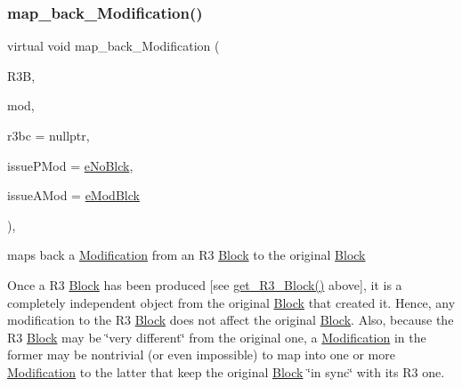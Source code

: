 \subsubsection{\texorpdfstring{map\+\_\+back\+\_\+\+Modification()}{map\_back\_Modification()}}
{\footnotesize\ttfamily virtual void map\+\_\+back\+\_\+\+Modification (\begin{DoxyParamCaption}\item[{\mbox{\hyperlink{class_s_m_spp__di__unipi__it_1_1_block}{Block}} $\ast$}]{R3B,  }\item[{\mbox{\hyperlink{group___modification___t_y_p_e_s_ga9024cf2ead61a1280d29771b063b1a62}{sp\+\_\+\+Mod}}}]{mod,  }\item[{\mbox{\hyperlink{class_s_m_spp__di__unipi__it_1_1_configuration}{Configuration}} $\ast$}]{r3bc = {\ttfamily nullptr},  }\item[{\mbox{\hyperlink{group___modification___t_y_p_e_s_ga544246d8c462e9a2d817c2c30797968f}{c\+\_\+\+Mod\+Param}}}]{issue\+P\+Mod = {\ttfamily \mbox{\hyperlink{group___modification___t_y_p_e_s_gga48fddcdd03a03f49b7e389ca1ed938d4ada69e89c5f46e563d8a13cfa6830c136}{e\+No\+Blck}}},  }\item[{\mbox{\hyperlink{group___modification___t_y_p_e_s_ga544246d8c462e9a2d817c2c30797968f}{c\+\_\+\+Mod\+Param}}}]{issue\+A\+Mod = {\ttfamily \mbox{\hyperlink{group___modification___t_y_p_e_s_gga48fddcdd03a03f49b7e389ca1ed938d4a21b14b26b1c0093a0905f6fc010bad29}{e\+Mod\+Blck}}} }\end{DoxyParamCaption})\hspace{0.3cm}{\ttfamily [inline]}, {\ttfamily [virtual]}}



maps back a \mbox{\hyperlink{class_s_m_spp__di__unipi__it_1_1_modification}{Modification}} from an R3 \mbox{\hyperlink{class_s_m_spp__di__unipi__it_1_1_block}{Block}} to the original \mbox{\hyperlink{class_s_m_spp__di__unipi__it_1_1_block}{Block}} 

Once a R3 \mbox{\hyperlink{class_s_m_spp__di__unipi__it_1_1_block}{Block}} has been produced \mbox{[}see \mbox{\hyperlink{class_s_m_spp__di__unipi__it_1_1_block_a2e682f5c0d4a74503c0cb5ab38fb6428}{get\+\_\+\+R3\+\_\+\+Block()}} above\mbox{]}, it is a completely independent object from the original \mbox{\hyperlink{class_s_m_spp__di__unipi__it_1_1_block}{Block}} that created it. Hence, any modification to the R3 \mbox{\hyperlink{class_s_m_spp__di__unipi__it_1_1_block}{Block}} does not affect the original \mbox{\hyperlink{class_s_m_spp__di__unipi__it_1_1_block}{Block}}. Also, because the R3 \mbox{\hyperlink{class_s_m_spp__di__unipi__it_1_1_block}{Block}} may be \char`\"{}very different\char`\"{} from the original one, a \mbox{\hyperlink{class_s_m_spp__di__unipi__it_1_1_modification}{Modification}} in the former may be nontrivial (or even impossible) to map into one or more \mbox{\hyperlink{class_s_m_spp__di__unipi__it_1_1_modification}{Modification}} to the latter that keep the original \mbox{\hyperlink{class_s_m_spp__di__unipi__it_1_1_block}{Block}} \char`\"{}in sync\char`\"{} with its R3 one.

